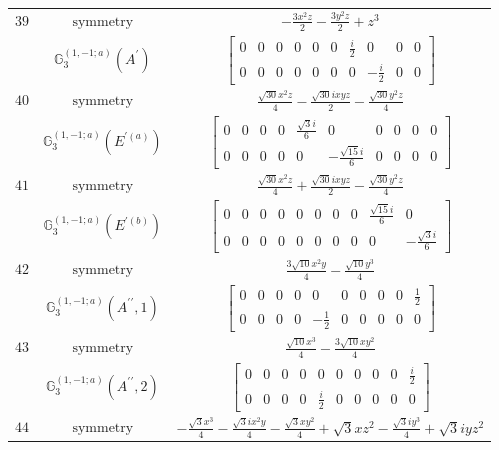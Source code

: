 \documentclass[fleqn,8pt,landscape]{jsarticle}
\begin{document}
\begin{longtable}{ccc}
$ 39 $ & $ \text{symmetry} $ & $ - \frac{3 x^{2} z}{2} - \frac{3 y^{2} z}{2} + z^{3} $ \\
$  $ & $ \mathbb{G}_{3}^{(1,-1;a)}(A^{\prime}) $ & $ \begin{bmatrix} 0 & 0 & 0 & 0 & 0 & 0 & \frac{i}{2} & 0 & 0 & 0 \\ 0 & 0 & 0 & 0 & 0 & 0 & 0 & - \frac{i}{2} & 0 & 0 \end{bmatrix} $ \\ \hline
$ 40 $ & $ \text{symmetry} $ & $ \frac{\sqrt{30} x^{2} z}{4} - \frac{\sqrt{30} i x y z}{2} - \frac{\sqrt{30} y^{2} z}{4} $ \\
$  $ & $ \mathbb{G}_{3}^{(1,-1;a)}(E^{\prime(a)}) $ & $ \begin{bmatrix} 0 & 0 & 0 & 0 & \frac{\sqrt{3} i}{6} & 0 & 0 & 0 & 0 & 0 \\ 0 & 0 & 0 & 0 & 0 & - \frac{\sqrt{15} i}{6} & 0 & 0 & 0 & 0 \end{bmatrix} $ \\ \hline
$ 41 $ & $ \text{symmetry} $ & $ \frac{\sqrt{30} x^{2} z}{4} + \frac{\sqrt{30} i x y z}{2} - \frac{\sqrt{30} y^{2} z}{4} $ \\
$  $ & $ \mathbb{G}_{3}^{(1,-1;a)}(E^{\prime(b)}) $ & $ \begin{bmatrix} 0 & 0 & 0 & 0 & 0 & 0 & 0 & 0 & \frac{\sqrt{15} i}{6} & 0 \\ 0 & 0 & 0 & 0 & 0 & 0 & 0 & 0 & 0 & - \frac{\sqrt{3} i}{6} \end{bmatrix} $ \\ \hline
$ 42 $ & $ \text{symmetry} $ & $ \frac{3 \sqrt{10} x^{2} y}{4} - \frac{\sqrt{10} y^{3}}{4} $ \\
$  $ & $ \mathbb{G}_{3}^{(1,-1;a)}(A^{\prime\prime},1) $ & $ \begin{bmatrix} 0 & 0 & 0 & 0 & 0 & 0 & 0 & 0 & 0 & \frac{1}{2} \\ 0 & 0 & 0 & 0 & - \frac{1}{2} & 0 & 0 & 0 & 0 & 0 \end{bmatrix} $ \\ \hline
$ 43 $ & $ \text{symmetry} $ & $ \frac{\sqrt{10} x^{3}}{4} - \frac{3 \sqrt{10} x y^{2}}{4} $ \\
$  $ & $ \mathbb{G}_{3}^{(1,-1;a)}(A^{\prime\prime},2) $ & $ \begin{bmatrix} 0 & 0 & 0 & 0 & 0 & 0 & 0 & 0 & 0 & \frac{i}{2} \\ 0 & 0 & 0 & 0 & \frac{i}{2} & 0 & 0 & 0 & 0 & 0 \end{bmatrix} $ \\ \hline
$ 44 $ & $ \text{symmetry} $ & $ - \frac{\sqrt{3} x^{3}}{4} - \frac{\sqrt{3} i x^{2} y}{4} - \frac{\sqrt{3} x y^{2}}{4} + \sqrt{3} x z^{2} - \frac{\sqrt{3} i y^{3}}{4} + \sqrt{3} i y z^{2} $ \\

\end{longtable}
\end{document}
